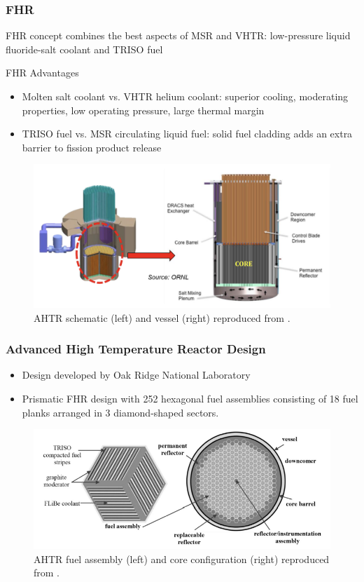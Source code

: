     \begin{frame}
    \frametitle{\acrlong{FHR}}
    FHR concept combines the best aspects of MSR and VHTR:
    low-pressure liquid fluoride-salt coolant and TRISO fuel 
    \begin{block}{\acrfull{FHR} Advantages}
        \begin{itemize}
        \item Molten salt coolant vs. VHTR helium coolant: superior cooling, 
        moderating properties, low operating pressure, large thermal margin
        \item TRISO fuel vs. MSR circulating liquid fuel: solid fuel cladding 
        adds an extra barrier to fission product release
        \end{itemize}
    \end{block}
    \begin{figure}[]
        \centering
        \includegraphics[width=0.5\linewidth]{../docs/figures/reactor-schematic.png} 
        \caption{\acrfull{AHTR} schematic (left) and vessel (right) reproduced from
        \cite{noauthor_fluoride_nodate}.}
    \end{figure}
    \end{frame}
    \begin{frame}
    \frametitle{Advanced High Temperature Reactor Design}
        \begin{itemize}
        \item Design developed by Oak Ridge National Laboratory
        \item Prismatic FHR design with 252 hexagonal fuel assemblies consisting of 
        18 fuel planks arranged in 3 diamond-shaped sectors. 
        \end{itemize}
    \begin{figure}[]
        \centering
        \includegraphics[width=0.9\linewidth]{../docs/figures/ahtr.png} 
        \caption{\acrlong{AHTR} fuel assembly (left) and core configuration (right) 
        reproduced from \cite{ramey_monte_2018}.}
        \label{fig:ahtr}
    \end{figure}
    \end{frame}

